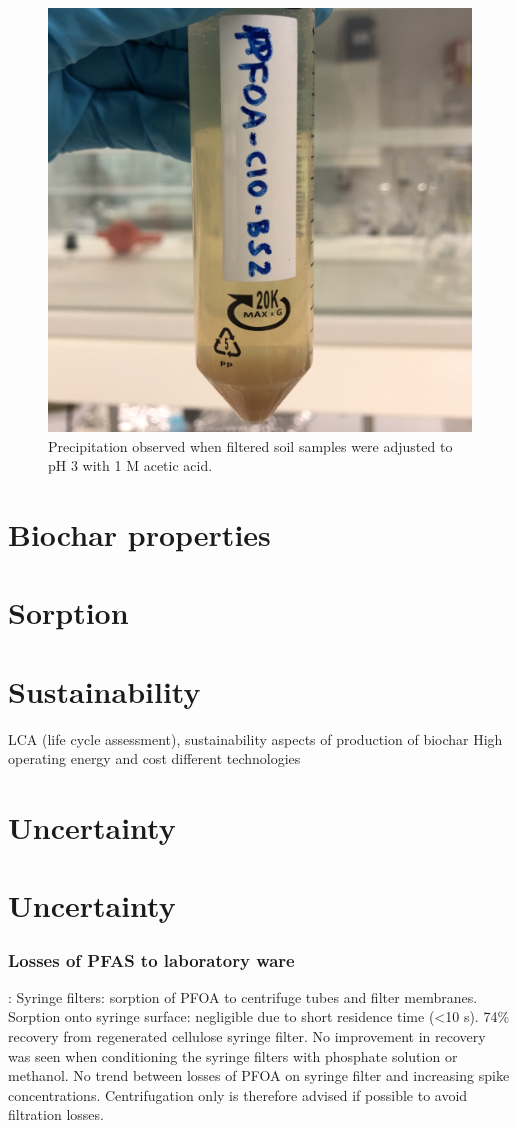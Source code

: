 \begin{figure}
    \centering
    \includegraphics[width=0.6\linewidth,scale=0.6]{Bilder/Samples/Precipitation.jpg}
    \caption{Precipitation observed when filtered soil samples were adjusted to pH 3 with 1 M acetic acid.}
    \label{fig:precip}
\end{figure}

\section{Biochar properties}



\section{Sorption}





\section{Sustainability}
LCA (life cycle assessment), sustainability aspects of production of biochar
High operating energy and cost different technologies \citep{Alhashimi2017}


\section{Uncertainty}
\section{Uncertainty}
\subsubsection{Losses of PFAS to laboratory ware}
\citep{Lath2019labsorb}: 
Syringe filters: sorption of PFOA to centrifuge tubes and filter membranes. Sorption onto syringe surface: negligible due to short residence time (\textless 10 s). 74\% recovery from regenerated cellulose syringe filter. No improvement in recovery was seen when conditioning the syringe filters with phosphate solution or methanol. No trend between losses of PFOA on syringe filter and increasing spike concentrations. Centrifugation only is therefore advised if possible to avoid filtration losses. 

